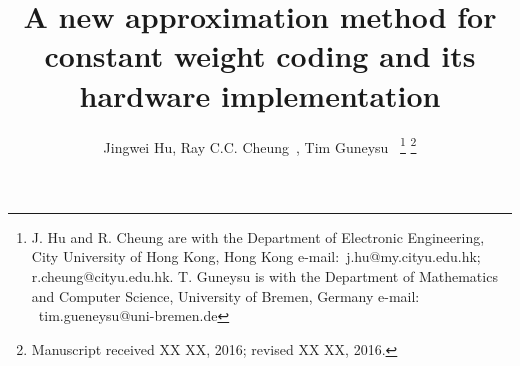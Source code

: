 \documentclass[10pt,journal,compsoc]{IEEEtran}
\begin{document}
%
\title{A new approximation method for constant weight coding and its hardware implementation}
%
%
%
%
\author{Jingwei Hu, Ray C.C. Cheung~, Tim Guneysu~
\thanks{J. Hu and R. Cheung are with the Department
of Electronic Engineering, City University of Hong Kong, Hong Kong e-mail:~j.hu@my.cityu.edu.hk; r.cheung@cityu.edu.hk.
T. Guneysu is with the Department of Mathematics and Computer Science, University of Bremen, Germany e-mail: ~tim.gueneysu@uni-bremen.de}
\thanks{Manuscript received XX XX, 2016; revised XX XX, 2016.}
}
\end{document}

